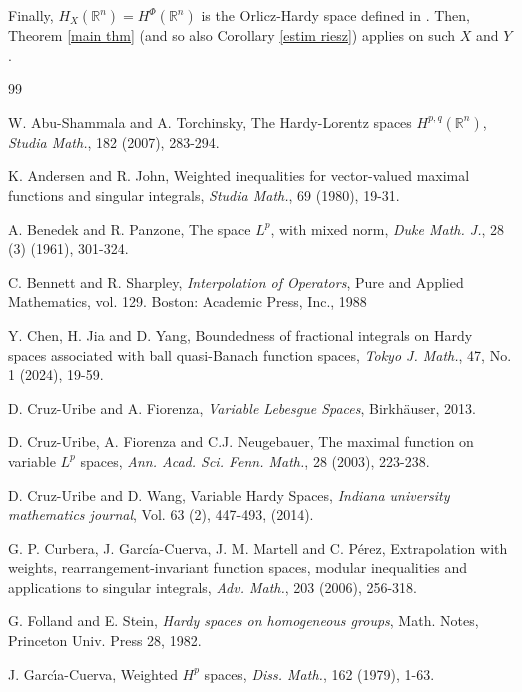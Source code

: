 \documentclass[oneside,10pt]{article}
\begin{document}
Finally, $H_X (\mathbb{R}^n) = H^{\Phi}(\mathbb{R}^n)$ is the Orlicz-Hardy space defined in \cite{Nakai2014}. Then, Theorem \ref{main thm} (and so also Corollary \ref{estim riesz}) applies on such $X$ and $Y$.

 


\begin{thebibliography}{99}

 W. Abu-Shammala and A. Torchinsky, The Hardy-Lorentz spaces $H^{p,q}(\mathbb{R}^n)$, \textit{Studia Math.},
182 (2007), 283-294.

 K. Andersen and R. John, Weighted inequalities for vector-valued maximal functions and singular integrals, 
\textit{Studia Math.}, 69 (1980), 19-31.

 A. Benedek and R. Panzone, The space $L^p$, with mixed norm, \textit{Duke Math. J.}, 28 (3) (1961), 301-324.

 C. Bennett and R. Sharpley, \textit{Interpolation of Operators}, Pure and Applied Mathematics, vol. 129. Boston: Academic
Press, Inc., 1988

 Y. Chen, H. Jia and D. Yang, Boundedness of fractional integrals on Hardy spaces associated with ball quasi-Banach function spaces, \textit{Tokyo J. Math.}, 47, No. 1 (2024), 19-59.

 D. Cruz-Uribe and A. Fiorenza, \textit{Variable Lebesgue Spaces}, Birkh\"auser, 2013.

 D. Cruz-Uribe, A. Fiorenza and C.J. Neugebauer, The maximal function on variable $L^p$ spaces, \textit{Ann. Acad. Sci. Fenn. Math.}, 28 (2003), 223-238.

 D. Cruz-Uribe and D. Wang, Variable Hardy Spaces, \textit{Indiana university mathematics journal}, Vol. 63 (2), 447-493, 
(2014).

 G. P. Curbera, J. Garc\'ia-Cuerva, J. M. Martell and C. P\'erez, Extrapolation with weights, rearrangement-invariant function spaces, modular inequalities and applications to singular integrals, \textit{Adv. Math.}, 203 (2006), 256-318.

 G. Folland and E. Stein, {\it Hardy spaces on homogeneous groups}, Math. Notes, Princeton Univ. Press 28, 1982.

 J. Garc\'{\i}a-Cuerva, Weighted $H^{p}$ spaces, \textit{Diss. Math.}, 162 (1979), 1-63.


\end{thebibliography}
\end{document}
